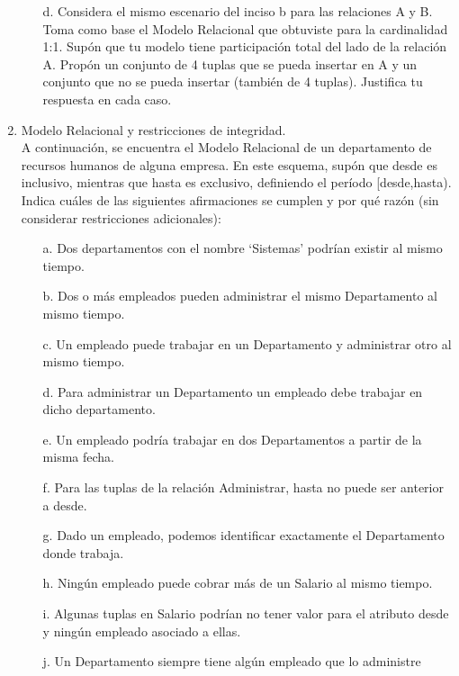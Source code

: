 \documentclass[12pt,a4paper]{article}
\begin{document}
\begin{enumerate}
\begin{enumerate}
			\item[d.] Considera el mismo escenario del inciso b para las relaciones A y B.
				Toma como base el Modelo Relacional que obtuviste para la cardinalidad 1:1.
				Supón que tu modelo tiene participación total del lado de la relación A.
				Propón un conjunto de 4 tuplas que se pueda insertar en A y un conjunto que no se pueda insertar
				(también de 4 tuplas). Justifica tu respuesta en cada caso.
		\end{enumerate}

	\item Modelo Relacional y restricciones de integridad.\\

		A continuación, se encuentra el Modelo Relacional de un departamento de recursos humanos de alguna empresa.
		En este esquema, supón que desde es inclusivo, mientras que hasta es exclusivo,
		definiendo el período [desde,hasta).
		Indica cuáles de las siguientes afirmaciones se cumplen y por qué razón
		(sin considerar restricciones adicionales):

		\begin{enumerate}
			\item[a.] Dos departamentos con el nombre ‘Sistemas’ podrían existir al mismo tiempo.\\
			\item[b.] Dos o más empleados pueden administrar el mismo Departamento al mismo tiempo.\\
			\item[c.] Un empleado puede trabajar en un Departamento y administrar otro al mismo tiempo.\\
			\item[d.] Para administrar un Departamento un empleado debe trabajar en dicho departamento.\\
			\item[e.] Un empleado podría trabajar en dos Departamentos a partir de la misma fecha.\\
			\item[f.] Para las tuplas de la relación Administrar, hasta no puede ser anterior a desde.\\
			\item[g.] Dado un empleado, podemos identificar exactamente el Departamento donde trabaja.\\
			\item[h.] Ningún empleado puede cobrar más de un Salario al mismo tiempo.\\
			\item[i.] Algunas tuplas en Salario podrían no tener valor para el atributo desde
				y ningún empleado asociado a ellas.\\
			\item[j.] Un Departamento siempre tiene algún empleado que lo administre\\
		\end{enumerate}

\end{enumerate}
\end{document}
